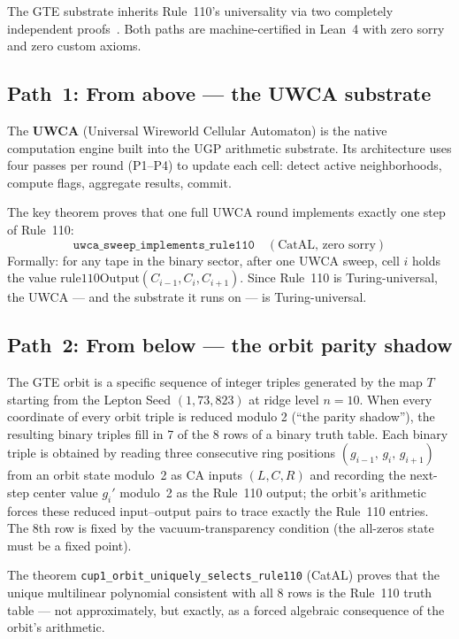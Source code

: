 \documentclass[11pt,a4paper]{article}
\newcommand{\term}[1]{\textbf{#1}}
\newcommand{\lean}[1]{\texttt{#1}}
\begin{document}
\smallskip
The GTE substrate inherits Rule~110's universality via two completely independent
proofs~\cite{SpivackCompUniversality}.  Both paths are machine-certified in Lean~4 with zero sorry and zero custom
axioms.

\subsection{Path~1: From above — the UWCA substrate}

The \term{UWCA} (Universal Wireworld Cellular Automaton) is the native computation
engine built into the UGP arithmetic substrate.  Its architecture uses four passes
per round (P1--P4) to update each cell: detect active neighborhoods, compute flags,
aggregate results, commit.

The key theorem proves that one full UWCA round implements exactly one step of
Rule~110:
\[
  \lean{uwca\_sweep\_implements\_rule110} \quad (\text{CatAL, zero sorry})
\]
Formally: for any tape in the binary sector, after one UWCA sweep, cell $i$ holds
the value $\mathrm{rule110Output}(C_{i-1}, C_i, C_{i+1})$.  Since Rule~110 is
Turing-universal, the UWCA — and the substrate it runs on — is Turing-universal.

\subsection{Path~2: From below — the orbit parity shadow}

The GTE orbit is a specific sequence of integer triples generated by the map $T$
starting from the Lepton Seed $(1, 73, 823)$ at ridge level $n=10$.
When every coordinate of every orbit triple is reduced modulo 2 (``the parity shadow''),
the resulting binary triples fill in 7 of the 8 rows of a binary truth table.
Each binary triple is obtained by reading three consecutive ring positions
$(g_{i-1},\,g_i,\,g_{i+1})$ from an orbit state modulo~2 as CA inputs $(L,C,R)$
and recording the next-step center value $g_i'$ modulo~2 as the Rule~110 output;
the orbit's arithmetic forces these reduced input--output pairs to trace exactly the
Rule~110 entries.
The 8th row is fixed by the vacuum-transparency condition (the all-zeros state must be
a fixed point).

The theorem \lean{cup1\_orbit\_uniquely\_selects\_rule110} (CatAL) proves that the
unique multilinear polynomial consistent with all 8 rows is the Rule~110 truth table —
not approximately, but exactly, as a forced algebraic consequence of the orbit's
arithmetic.
\end{document}
